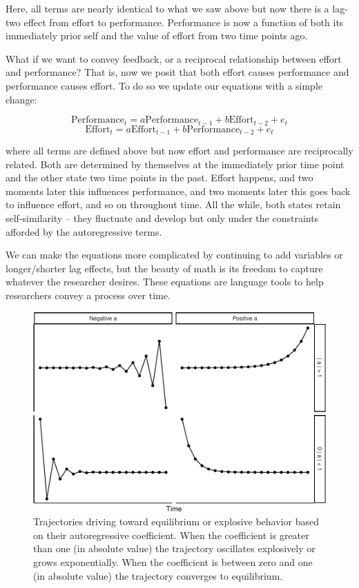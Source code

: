 \documentclass[english,,man]{apa6}
\theoremstyle{definition}
\theoremstyle{definition}
\theoremstyle{definition}
\theoremstyle{remark}
\begin{document}
\noindent Here, all terms are nearly identical to what we saw above but
now there is a lag-two effect from effort to performance. Performance is
now a function of both its immediately prior self and the value of
effort from two time points ago.

What if we want to convey feedback, or a reciprocal relationship between
effort and performance? That is, now we posit that both effort causes
performance and performance causes effort. To do so we update our
equations with a simple change:

\begin{equation}
\label{sysy3}
\textrm{Performance}_{t} = a \textrm{Performance}_{t - 1} + b \textrm{Effort}_{t - 2} + e_{t}
\end{equation} \begin{equation}
\label{sysx3}
\textrm{Effort}_{t} = a \textrm{Effort}_{t - 1} + b \textrm{Performance}_{t - 2} + e_{t}
\end{equation}

\noindent where all terms are defined above but now effort and
performance are reciprocally related. Both are determined by themselves
at the immediately prior time point and the other state two time points
in the past. Effort happens, and two moments later this influences
performance, and two moments later this goes back to influence effort,
and so on throughout time. All the while, both states retain
self-similarity -- they fluctuate and develop but only under the
constraints afforded by the autoregressive terms.

We can make the equations more complicated by continuing to add
variables or longer/shorter lag effects, but the beauty of math is its
freedom to capture whatever the researcher desires. These equations are
language tools to help researchers convey a process over time.

\begin{figure}
\centering
\includegraphics{figs/unnamed-chunk-9-1.pdf}
\caption{\label{fig:unnamed-chunk-9}Trajectories driving toward equilibrium
or explosive behavior based on their autoregressive coefficient. When
the coefficient is greater than one (in absolute value) the trajectory
oscillates explosively or grows exponentially. When the coefficient is
between zero and one (in absolute value) the trajectory converges to
equilibrium.\label{dynamics_plot}}
\end{figure}
\end{document}
